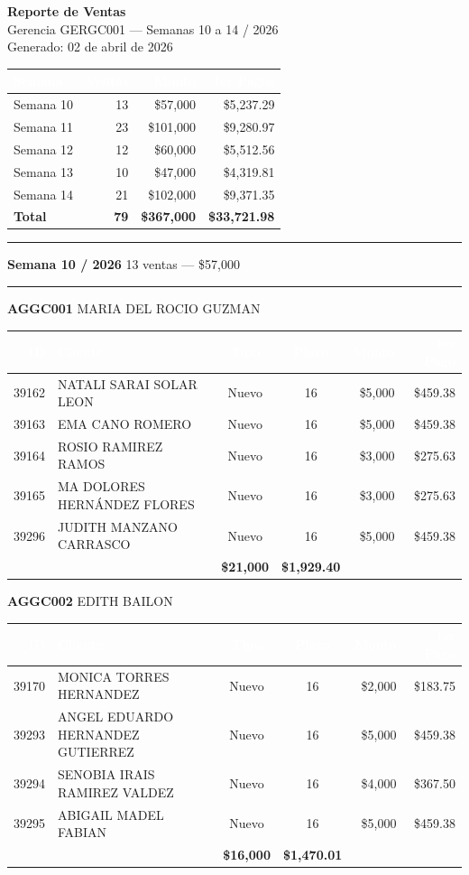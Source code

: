 \documentclass[10pt,a4paper]{article}
\newcommand{\semhdr}[3]{%
  \vspace{14pt}
  {\color{weekhdr}\Large\textbf{Semana #1 / 2026}} \hfill {\normalsize #2 ventas --- \$#3}\\[2pt]
  \rule{\textwidth}{0.4pt}\vspace{4pt}
}
\newcommand{\aghdr}[2]{%
  \vspace{8pt}
  {\color{hdr}\normalsize\textbf{#1}} \hfill {\scriptsize #2}\\[4pt]
}
\newenvironment{vtable}{%
  \rowcolors{2}{lg}{white}
  \begin{tabular}{>{\scriptsize}r >{\scriptsize}l >{\scriptsize}c >{\scriptsize}c >{\scriptsize}r >{\scriptsize}r}
  \toprule
  \rowcolor{hdr}
  \textcolor{white}{\textbf{ID}} & \textcolor{white}{\textbf{Cliente}} & \textcolor{white}{\textbf{Tipo}} & \textcolor{white}{\textbf{Plazo}} & \textcolor{white}{\textbf{Monto}} & \textcolor{white}{\textbf{1er Pago}} \\
  \midrule
}{%
  \bottomrule
  \end{tabular}
}
\newcommand{\subtot}[3]{%
  \midrule
  \rowcolor{sub}
  \multicolumn{3}{l}{\textbf{Subtotal: #1}} & & \textbf{\$#2} & \textbf{\$#3} \\
}
\begin{document}
{\color{hdr}\LARGE\textbf{Reporte de Ventas}}\\[4pt]
{\large Gerencia GERGC001 --- Semanas 10 a 14 / 2026}\\[2pt]
{\color{gray}\small Generado: 02 de abril de 2026}

\vspace{8pt}

{\small
\begin{tabular}{l r r r}
\toprule
\rowcolor{hdr}
\textcolor{white}{\textbf{Semana}} & \textcolor{white}{\textbf{Ventas}} & \textcolor{white}{\textbf{Monto}} & \textcolor{white}{\textbf{1er Pagos}} \\
\midrule
\rowcolor{lg} Semana 10 & 13 & \$57,000 & \$5,237.29 \\
Semana 11 & 23 & \$101,000 & \$9,280.97 \\
\rowcolor{lg} Semana 12 & 12 & \$60,000 & \$5,512.56 \\
Semana 13 & 10 & \$47,000 & \$4,319.81 \\
\rowcolor{lg} Semana 14 & 21 & \$102,000 & \$9,371.35 \\
\midrule
\textbf{Total} & \textbf{79} & \textbf{\$367,000} & \textbf{\$33,721.98} \\
\bottomrule
\end{tabular}
}

\vspace{6pt}\rule{\textwidth}{0.5pt}

\semhdr{10}{13}{57,000}

\aghdr{AGGC001}{MARIA DEL ROCIO GUZMAN}
\begin{vtable}
39162 & NATALI SARAI SOLAR LEON & Nuevo & 16 & \$5,000 & \$459.38 \\
39163 & EMA CANO ROMERO & Nuevo & 16 & \$5,000 & \$459.38 \\
39164 & ROSIO RAMIREZ RAMOS & Nuevo & 16 & \$3,000 & \$275.63 \\
39165 & MA DOLORES HERN\'ANDEZ FLORES & Nuevo & 16 & \$3,000 & \$275.63 \\
39296 & JUDITH MANZANO CARRASCO & Nuevo & 16 & \$5,000 & \$459.38 \\
\subtot{5 ventas}{21,000}{1,929.40}
\end{vtable}

\aghdr{AGGC002}{EDITH BAILON}
\begin{vtable}
39170 & MONICA TORRES HERNANDEZ & Nuevo & 16 & \$2,000 & \$183.75 \\
39293 & ANGEL EDUARDO HERNANDEZ GUTIERREZ & Nuevo & 16 & \$5,000 & \$459.38 \\
39294 & SENOBIA IRAIS RAMIREZ VALDEZ & Nuevo & 16 & \$4,000 & \$367.50 \\
39295 & ABIGAIL MADEL FABIAN & Nuevo & 16 & \$5,000 & \$459.38 \\
\subtot{4 ventas}{16,000}{1,470.01}
\end{vtable}
\end{document}
